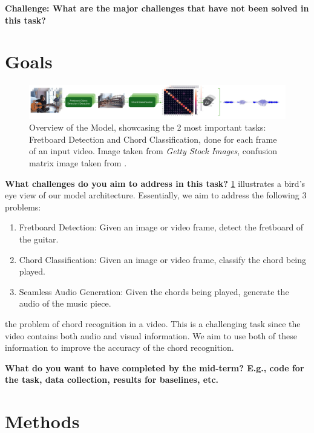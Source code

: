 \documentclass[10pt,twocolumn,letterpaper]{article}
\begin{document}
\textbf{Challenge: What are the major challenges that have not been solved in this task?}

\cite{Kristian_Zaman_Tenoyo_Jodhinata_2024}
\cite{du2023conditional}

\section{Goals}

\begin{figure}[h]
    \centering
    \includegraphics[width=\textwidth]{images/task-diagram.pdf}
    \caption{Overview of the Model, showcasing the 2 most important tasks: 
    Fretboard Detection and Chord Classification, done for each frame of an input video. Image taken from \textit{Getty Stock Images}, confusion matrix image taken from \cite{Kristian_Zaman_Tenoyo_Jodhinata_2024}.}
    \label{fig:model-diagram}
\end{figure}

\textbf{What challenges do you aim to address in this task?}
\cref{fig:model-diagram} illustrates a bird's eye view of our model architecture. Essentially, we aim to address the following 3 problems: 
\begin{enumerate}
    \item Fretboard Detection: Given an image or video frame, detect the fretboard of the guitar.
    \item Chord Classification: Given an image or video frame, classify the chord being played.
    \item Seamless Audio Generation: Given the chords being played, generate the audio of the music piece.
\end{enumerate}
the problem of chord recognition in a video. This is a challenging task since the video contains both audio and visual information. We aim to use both of these information to improve the accuracy of the chord recognition.


\textbf{What do you want to have completed by the mid-term? E.g., code for the task, data collection, results for baselines, etc.}




\section{Methods}
\end{document}
